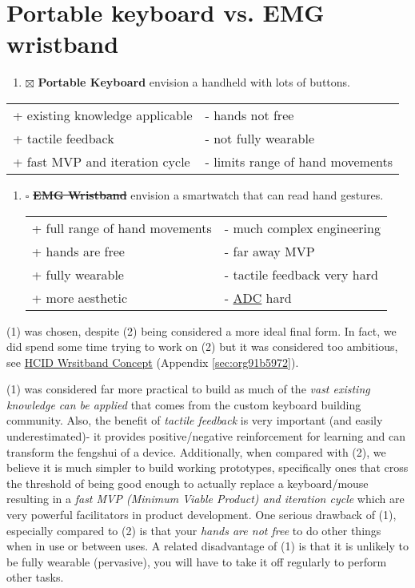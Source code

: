 \documentclass[logo,bsc,singlespacing,parskip]{infthesis}
\begin{document}
\section{Portable keyboard vs. EMG wristband}
\label{sec:org6fbc9b1}
\begin{enumerate}
\item{$\boxtimes$} \textbf{Portable Keyboard} envision a handheld with lots of buttons.
\end{enumerate}
\begin{longtable}{|p{6.25cm}|p{6.25cm}|}
\hline
+ existing knowledge applicable & - hands not free\\
+ tactile feedback & - not fully wearable\\
+ fast MVP and iteration cycle & - limits range of hand movements\\
\hline
\end{longtable}
\begin{enumerate}
\item{$\square$} \sout{\textbf{EMG Wristband}} envision a smartwatch that can read hand gestures.
\begin{longtable}{|p{6.25cm}|p{6.25cm}|}
\hline
+ full range of hand movements & - much complex engineering\\
+ hands are free & - far away MVP\\
+ fully wearable & - tactile feedback very hard\\
+ more aesthetic & - \hyperref[org633bfb2]{ADC} hard\\
\hline
\end{longtable}
\end{enumerate}

(1) was chosen, despite (2) being considered a more ideal final form.
In fact, we did spend some time trying to work on (2) but it was considered too ambitious, see \hyperref[sec:org91b5972]{HCID Wrsitband Concept} (Appendix \ref{sec:org91b5972}).

(1) was considered far more practical to build as much of the \emph{vast existing knowledge can be applied} that comes from the custom keyboard building community.
Also, the benefit of \emph{tactile feedback} is very important (and easily underestimated)- it provides positive/negative reinforcement for learning and can transform the fengshui of a device.
Additionally, when compared with (2), we believe it is much simpler to build working prototypes, specifically ones that cross the threshold of being good enough to actually replace a keyboard/mouse resulting in a \emph{fast MVP (Minimum Viable Product) and iteration cycle} which are very powerful facilitators in product development.
One serious drawback of (1), especially compared to (2) is that your \emph{hands are not free} to do other things when in use or between uses. A related disadvantage of (1) is that it is unlikely to be fully wearable (pervasive), you will have to take it off regularly to perform other tasks.
\end{document}
